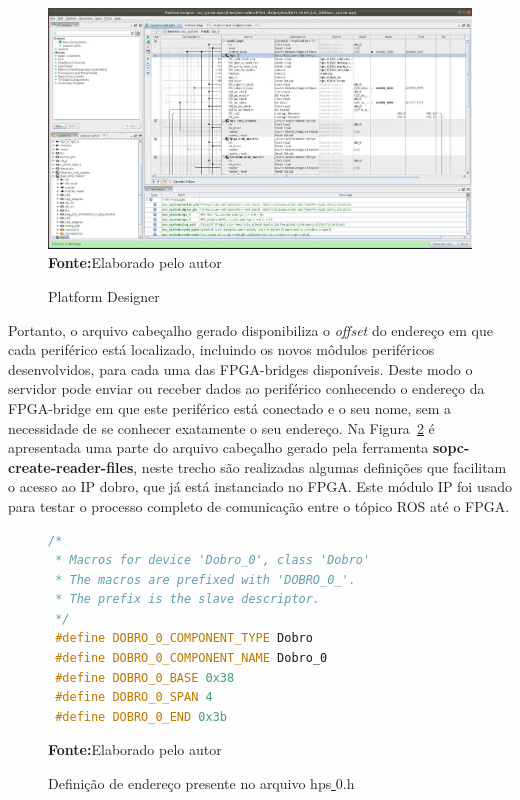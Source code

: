 \begin{figure}[ht]
	\caption{Platform Designer}
	\begin{center}
		\includegraphics[scale=0.35]{imagens/Platiform.png}\\
		{\small \textbf{Fonte:}Elaborado pelo autor}
    \end{center}\label{fig:Platform}
\end{figure} 

Portanto, o arquivo cabeçalho gerado disponibiliza o \textit{offset} do endereço em que cada periférico está localizado, incluindo os novos môdulos periféricos desenvolvidos, para cada uma das FPGA-bridges disponíveis. Deste modo o servidor pode enviar ou receber dados ao periférico conhecendo o endereço da FPGA-bridge em que este periférico está conectado e o seu nome, sem a necessidade de se conhecer exatamente o seu endereço. Na Figura~\ref{fig:codigodobro} é apresentada uma parte do arquivo cabeçalho gerado pela ferramenta \textbf{sopc-create-reader-files}, neste trecho são realizadas algumas definições que facilitam o acesso ao IP dobro, que já está instanciado no FPGA\@. Este módulo IP foi usado para testar o processo completo de comunicação entre o tópico ROS até o FPGA\@.


\begin{figure}[ht]
\caption{Definição de endereço presente no arquivo hps\underline{ }0.h}
\begin{center}
\begin{lstlisting}[language=C++, backgroundcolor=\color{gray!10}]
 /*
 * Macros for device 'Dobro_0', class 'Dobro'
 * The macros are prefixed with 'DOBRO_0_'.
 * The prefix is the slave descriptor.
 */
 #define DOBRO_0_COMPONENT_TYPE Dobro
 #define DOBRO_0_COMPONENT_NAME Dobro_0
 #define DOBRO_0_BASE 0x38
 #define DOBRO_0_SPAN 4
 #define DOBRO_0_END 0x3b
\end{lstlisting}
{\small \textbf{Fonte:}Elaborado pelo autor}	
\end{center}\label{fig:codigodobro}
\end{figure}


